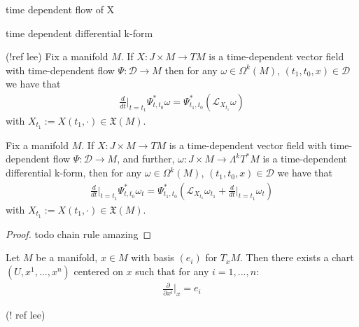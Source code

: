 \begin{definition}
time dependent flow of X
\end{definition}

\begin{definition}
time dependent differential k-form
\end{definition}

\begin{proposition}
(!ref lee)
Fix a manifold $M$. If $X : J \times M \to TM$ is a time-dependent vector field with time-dependent flow $\Psi: \mathcal{D} \to M$ then for any $\omega \in \Omega^k(M)$, $(t_1,t_0,x) \in \mathcal{D}$ we have that
\begin{align*}
\frac{d}{dt} \bigg\vert_{t=t_1} \Psi^*_{t,t_0} \omega = \Psi^*_{t_1,t_0} \left( \mathcal{L}_{X_{t_1}} \omega \right)
\end{align*}
with $X_{t_1} := X(t_1, \cdot) \in \mathfrak{X}(M)$.
\end{proposition}

\begin{proposition}
Fix a manifold $M$. If $X : J \times M \to TM$ is a time-dependent vector field with time-dependent flow $\Psi: \mathcal{D} \to M$, and further, $\omega : J \times M \to \Lambda^k T^* M$ is a time-dependent differential k-form, then for any $\omega \in \Omega^k(M)$, $(t_1,t_0,x) \in \mathcal{D}$ we have that
\begin{align*}
\frac{d}{dt} \bigg\vert_{t=t_1} \Psi^*_{t,t_0} \omega_t = \Psi^*_{t_1,t_0} \left( \mathcal{L}_{X_{t_1}} \omega_{t_1} + \frac{d}{dt} \bigg\vert_{t=t_1} \omega_t \right)
\end{align*}
with $X_{t_1} := X(t_1, \cdot) \in \mathfrak{X}(M)$.
\end{proposition}

\begin{proof}
todo chain rule amazing
\end{proof}

\begin{lemma}\label{auxprop1}
Let $M$ be a manifold, $x \in M$ with basis $(e_i)$ for $T_x M$. Then there exists a chart $(U, x^1, ... ,x^n)$ centered on $x$ such that for any $i = 1, ... , n$:
\begin{align*}
\frac{\partial}{\partial x^i} \bigg\vert_x = e_i
\end{align*}
\end{lemma}

\begin{definition}
(! ref lee)

\end{definition}

